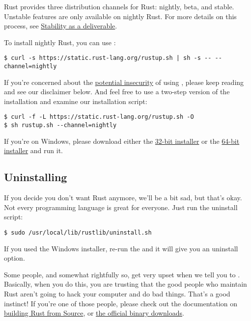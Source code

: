 Rust provides three distribution channels for Rust: nightly, beta, and stable. Unstable features are only available 
on nightly Rust. For more details on this process, see \href{http://blog.rust-lang.org/2014/10/30/Stability.html}{Stability 
as a deliverable}.

\blank

To install nightly Rust, you can use :

\begin{verbatim}
$ curl -s https://static.rust-lang.org/rustup.sh | sh -s -- --channel=nightly
\end{verbatim}

If you're concerned about the \href{http://curlpipesh.tumblr.com/}{potential insecurity} of using , 
please keep reading and see our disclaimer below. And feel free to use a two-step version of the installation and examine 
our installation script:

\begin{verbatim}
$ curl -f -L https://static.rust-lang.org/rustup.sh -O
$ sh rustup.sh --channel=nightly
\end{verbatim}

If you're on Windows, please download either the 
\href{https://static.rust-lang.org/dist/rust-nightly-i686-pc-windows-gnu.msi}{32-bit installer} or the 
\href{https://static.rust-lang.org/dist/rust-nightly-x86_64-pc-windows-gnu.msi}{64-bit installer} and run it.

\subsection*{Uninstalling}

If you decide you don't want Rust anymore, we'll be a bit sad, but that's okay. Not every programming language is great 
for everyone. Just run the uninstall script:

\begin{verbatim}
$ sudo /usr/local/lib/rustlib/uninstall.sh
\end{verbatim}

If you used the Windows installer, re-run the  and it will give you an uninstall option.

\blank

Some people, and somewhat rightfully so, get very upset when we tell you to . Basically, when you do this, 
you are trusting that the good people who maintain Rust aren't going to hack your computer and do bad things. That's a good 
instinct! If you're one of those people, please check out the documentation on 
\href{https://github.com/rust-lang/rust\#building-from-source}{building Rust from Source}, or 
\href{https://www.rust-lang.org/install.html}{the official binary downloads}.

